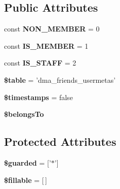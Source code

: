 \subsection*{Public Attributes}
\begin{DoxyCompactItemize}
\item 
\hypertarget{classDMA_1_1Friends_1_1Models_1_1Usermeta_a3e0526daabd8785649e0755dbdf4ebae}{const {\bfseries N\-O\-N\-\_\-\-M\-E\-M\-B\-E\-R} = 0}\label{classDMA_1_1Friends_1_1Models_1_1Usermeta_a3e0526daabd8785649e0755dbdf4ebae}

\item 
\hypertarget{classDMA_1_1Friends_1_1Models_1_1Usermeta_aa5a492cddba999d3798f2d0c2340fad5}{const {\bfseries I\-S\-\_\-\-M\-E\-M\-B\-E\-R} = 1}\label{classDMA_1_1Friends_1_1Models_1_1Usermeta_aa5a492cddba999d3798f2d0c2340fad5}

\item 
\hypertarget{classDMA_1_1Friends_1_1Models_1_1Usermeta_a73c2b62b4d8e31f04c362931cf4fad77}{const {\bfseries I\-S\-\_\-\-S\-T\-A\-F\-F} = 2}\label{classDMA_1_1Friends_1_1Models_1_1Usermeta_a73c2b62b4d8e31f04c362931cf4fad77}

\item 
\hypertarget{classDMA_1_1Friends_1_1Models_1_1Usermeta_a7ca76640d4cd53c875648ec87d085f1d}{{\bfseries \$table} = 'dma\-\_\-friends\-\_\-usermetas'}\label{classDMA_1_1Friends_1_1Models_1_1Usermeta_a7ca76640d4cd53c875648ec87d085f1d}

\item 
\hypertarget{classDMA_1_1Friends_1_1Models_1_1Usermeta_ae1136713ee0c7d6696930ebe2401f19c}{{\bfseries \$timestamps} = false}\label{classDMA_1_1Friends_1_1Models_1_1Usermeta_ae1136713ee0c7d6696930ebe2401f19c}

\item 
{\bfseries \$belongs\-To}
\end{DoxyCompactItemize}
\subsection*{Protected Attributes}
\begin{DoxyCompactItemize}
\item 
\hypertarget{classDMA_1_1Friends_1_1Models_1_1Usermeta_a95d74f02cd302db9566b8da29154e82d}{{\bfseries \$guarded} = \mbox{[}'$\ast$'\mbox{]}}\label{classDMA_1_1Friends_1_1Models_1_1Usermeta_a95d74f02cd302db9566b8da29154e82d}

\item 
\hypertarget{classDMA_1_1Friends_1_1Models_1_1Usermeta_a1dca0217848634cab6e2ad205804e351}{{\bfseries \$fillable} = \mbox{[}$\,$\mbox{]}}\label{classDMA_1_1Friends_1_1Models_1_1Usermeta_a1dca0217848634cab6e2ad205804e351}

\end{DoxyCompactItemize}


